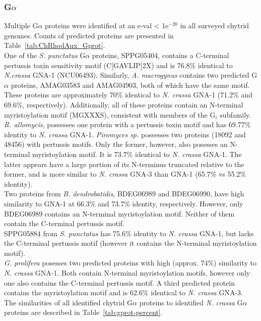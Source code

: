\subsubsection{G$\alpha$}
Multiple G$\alpha$ proteins were identified at an e-val < 1e$^{-20}$ in all surveyed chytrid genomes. Counts of predicted proteins are presented in Table~\ref{tab:ChRhodAux_Gprot}.\\
\indent One of the \textit{S. punctatus} G$\alpha$ proteins, SPPG05404, contains a C-terminal pertussis toxin sensitivity motif (C[GAVLIP]{2}X) and is 76.8\% identical to \textit{N.crassa} GNA-1 (NCU06493). Similarly, \textit{A. macrogynus} contains two predicted G$\alpha$ proteins, AMAG03583 and AMAG04903, both of which have the same motif. These proteins are approximately 70\% identical to \textit{N. crassa} GNA-1 (71.2\% and 69.6\%, respectively). Additionally, all of these proteins contain an N-terminal myristoylation motif (MGXXXS), consistent with members of the G$_{i}$ subfamily. \textit{R. allomycis}, possesses one protein with a pertussis toxin motif and has 69.77\% identity to \textit{N. crassa} GNA-1. \textit{Piromyces sp.} possesses two proteins (18092 and 48456) with pertussis motifs. Only the former, however, also posesses an N-terminal myristoylation motif. It is 73.7\% identical to \textit{N. crassa} GNA-1. The latter appears have a large portion of its N-terminus truncated relative to the former, and is more similar to \textit{N. crassa} GNA-3 than GNA-1 (65.7\% vs 55.2\% identity).\\
\indent Two proteins from \textit{B. dendrobatidis}, BDEG06989 and BDEG06990, have high similarity to GNA-1 at 66.3\% and 73.7\% identity, respectively. However, only BDEG06989 contains an N-terminal myristoylation motif. Neither of them contain the C-terminal pertussis motif.\\
\indent SPPG05884 from \textit{S. punctatus} has 75.6\% identity to \textit{N. crassa} GNA-1, but lacks the C-terminal pertussis motif (however it contains the N-terminal myristoylation motif).\\
\indent \textit{G. prolifera} posesses two predicted proteins with high (approx. 74\%) similarity to \textit{N. crassa} GNA-1. Both contain N-terminal myristoylation motifs, however only one also contains the C-terminal pertussis motif. A third predicted protein contains the myristoylation motif and is 62.6\% identical to \textit{N. crassa} GNA-3.\\
\indent The similarities of all identified chytrid G$\alpha$ proteins to identified \textit{N. crassa} G$\alpha$ proteins are described in Table~\ref{tab:gprot-percent}.\\
